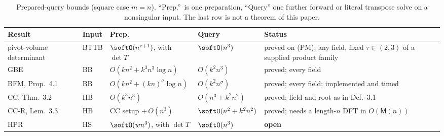 \begin{table}[p]
\caption{Prepared-query bounds (square case $m=n$).  ``Prep.''\ is one
preparation, ``Query'' one further forward or literal transpose solve on a
nonsingular input.  The last row is not a theorem of this paper.}

\centering
\small
\begin{tabular}{@{}llllp{3.6cm}@{}}
\hline
Result & Input & Prep. & Query & Status \\
\hline

pivot-volume determinant & BTTB & $\softO(n^{\tau+1})$, with $\det T$ & $\softO(n^3)$ & \raggedright proved on (PM); any field, fixed $\tau\in(2,3)$ of a supplied product family \tabularnewline

GBE & BB & $O(kn^2+k^3n^3\log n)$ & $O(k^2n^3)$ & \raggedright proved; every field \tabularnewline

BFM, Prop.~4.1 & BB & $O(kn^2+(kn)^\sigma\log n)$ & $O(k^2n^\sigma)$ & \raggedright proved; every field; implemented and timed \tabularnewline

CC, Thm.~3.2 & HB & $O(k^3n^3)$ & $O(n^3+k^2n^2)$ & \raggedright proved; field and root as in Def.~3.1 \tabularnewline

CC-R, Lem.~3.3 & HB & CC setup $+\,O(n^3)$ & $\softO(n^2+k^2n^2)$ & \raggedright proved; needs a length-$n$ DFT in $O(\mathsf M(n))$ \tabularnewline

HPR & HS & $\softO(wn^3)$, with $\det T$ & $\softO(n^3)$ & \raggedright \textbf{open} \tabularnewline
\hline
\end{tabular}
\end{table}
